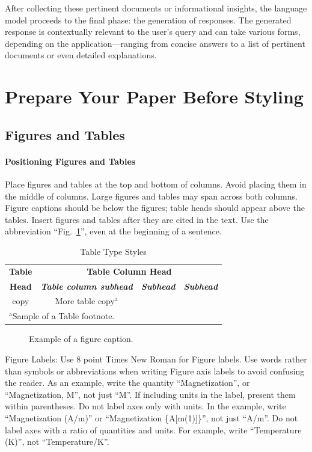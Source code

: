 \documentclass[conference]{IEEEtran}
\begin{document}
After collecting these pertinent documents or informational insights, the language model proceeds to the final phase: the generation of responses. The generated response is contextually relevant to the user's query and can take various forms, depending on the application—ranging from concise answers to a list of pertinent documents or even detailed explanations.



\section{Prepare Your Paper Before Styling}

\subsection{Figures and Tables}
\paragraph{Positioning Figures and Tables} Place figures and tables at the top and 
bottom of columns. Avoid placing them in the middle of columns. Large 
figures and tables may span across both columns. Figure captions should be 
below the figures; table heads should appear above the tables. Insert 
figures and tables after they are cited in the text. Use the abbreviation 
``Fig.~\ref{fig}'', even at the beginning of a sentence.

\begin{table}[htbp]
\caption{Table Type Styles}
\begin{center}
\begin{tabular}{|c|c|c|c|}
\hline
\textbf{Table}&\multicolumn{3}{|c|}{\textbf{Table Column Head}} \\
\cline{2-4} 
\textbf{Head} & \textbf{\textit{Table column subhead}}& \textbf{\textit{Subhead}}& \textbf{\textit{Subhead}} \\
\hline
copy& More table copy$^{\mathrm{a}}$& &  \\
\hline
\multicolumn{4}{l}{$^{\mathrm{a}}$Sample of a Table footnote.}
\end{tabular}
\label{tab1}
\end{center}
\end{table}

\begin{figure}[htbp]
\caption{Example of a figure caption.}
\label{fig}
\end{figure}

Figure Labels: Use 8 point Times New Roman for Figure labels. Use words 
rather than symbols or abbreviations when writing Figure axis labels to 
avoid confusing the reader. As an example, write the quantity 
``Magnetization'', or ``Magnetization, M'', not just ``M''. If including 
units in the label, present them within parentheses. Do not label axes only 
with units. In the example, write ``Magnetization (A/m)'' or ``Magnetization 
\{A[m(1)]\}'', not just ``A/m''. Do not label axes with a ratio of 
quantities and units. For example, write ``Temperature (K)'', not 
``Temperature/K''.
\end{document}
